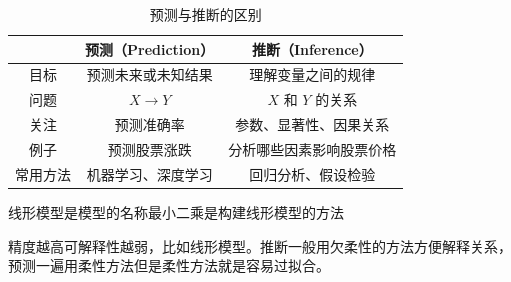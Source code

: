 \begin{table}[htbp]
    \centering
    \caption{预测与推断的区别}
    \begin{tabular}{c|c|c}
        \hline
        & \textbf{预测（Prediction）} & \textbf{推断（Inference）} \\
        \hline
        目标 
        & 预测未来或未知结果 
        & 理解变量之间的规律 \\
        \hline
        问题 
        & $X \rightarrow Y$ 
        & $X$ 和 $Y$ 的关系 \\
        \hline
        关注 
        & 预测准确率 
        & 参数、显著性、因果关系 \\
        \hline
        例子 
        & 预测股票涨跌 
        & 分析哪些因素影响股票价格 \\
        \hline
        常用方法 
        & 机器学习、深度学习 
        & 回归分析、假设检验 \\
        \hline
    \end{tabular}
\end{table}
\begin{dxtips}
    线形模型是模型的名称最小二乘是构建线形模型的方法
\end{dxtips}
\begin{note}
    精度越高可解释性越弱，比如线形模型。推断一般用欠柔性的方法方便解释关系，预测一遍用柔性方法但是柔性方法就是容易过拟合。
\end{note}
